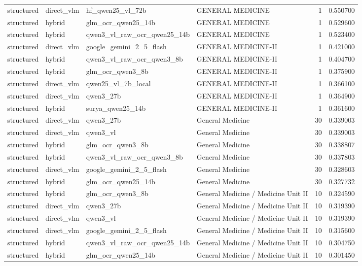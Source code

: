 \begin{tabular}{llllrr}
structured & direct\_vlm & hf\_qwen25\_vl\_72b & GENERAL MEDICINE & 1 & 0.550700 \\
structured & hybrid & glm\_ocr\_qwen25\_14b & GENERAL MEDICINE & 1 & 0.529600 \\
structured & hybrid & qwen3\_vl\_raw\_ocr\_qwen25\_14b & GENERAL MEDICINE & 1 & 0.523400 \\
structured & direct\_vlm & google\_gemini\_2\_5\_flash & GENERAL MEDICINE-II & 1 & 0.421000 \\
structured & hybrid & qwen3\_vl\_raw\_ocr\_qwen3\_8b & GENERAL MEDICINE-II & 1 & 0.404700 \\
structured & hybrid & glm\_ocr\_qwen3\_8b & GENERAL MEDICINE-II & 1 & 0.375900 \\
structured & direct\_vlm & qwen25\_vl\_7b\_local & GENERAL MEDICINE-II & 1 & 0.366100 \\
structured & direct\_vlm & qwen3\_27b & GENERAL MEDICINE-II & 1 & 0.364900 \\
structured & hybrid & surya\_qwen25\_14b & GENERAL MEDICINE-II & 1 & 0.361600 \\
structured & direct\_vlm & qwen3\_27b & General Medicine & 30 & 0.339003 \\
structured & direct\_vlm & qwen3\_vl & General Medicine & 30 & 0.339003 \\
structured & hybrid & glm\_ocr\_qwen3\_8b & General Medicine & 30 & 0.338807 \\
structured & hybrid & qwen3\_vl\_raw\_ocr\_qwen3\_8b & General Medicine & 30 & 0.337803 \\
structured & direct\_vlm & google\_gemini\_2\_5\_flash & General Medicine & 30 & 0.328603 \\
structured & hybrid & glm\_ocr\_qwen25\_14b & General Medicine & 30 & 0.327732 \\
structured & hybrid & glm\_ocr\_qwen3\_8b & General Medicine / Medicine Unit II & 10 & 0.324590 \\
structured & direct\_vlm & qwen3\_27b & General Medicine / Medicine Unit II & 10 & 0.319390 \\
structured & direct\_vlm & qwen3\_vl & General Medicine / Medicine Unit II & 10 & 0.319390 \\
structured & direct\_vlm & google\_gemini\_2\_5\_flash & General Medicine / Medicine Unit II & 10 & 0.315600 \\
structured & hybrid & qwen3\_vl\_raw\_ocr\_qwen25\_14b & General Medicine / Medicine Unit II & 10 & 0.304750 \\
structured & hybrid & glm\_ocr\_qwen25\_14b & General Medicine / Medicine Unit II & 10 & 0.301450 \\

\end{tabular}
